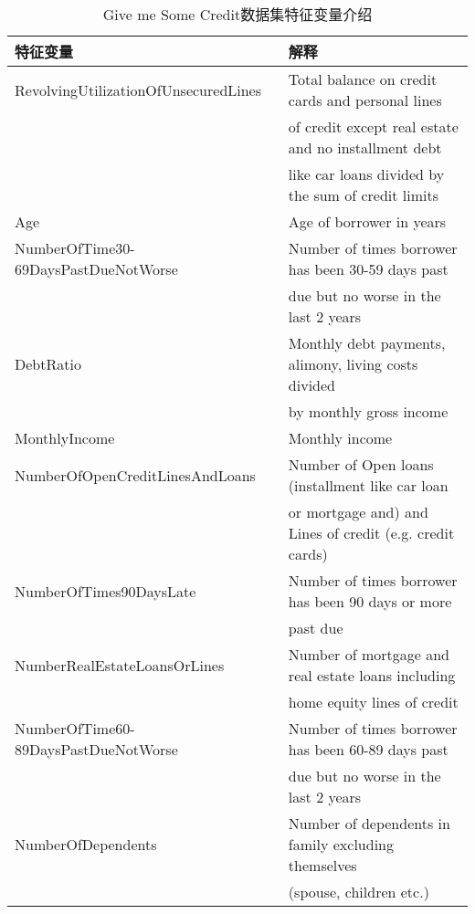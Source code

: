 \begin{table}[htbp]
	\centering
	\caption{\label{tab:kaggle}Give me Some Credit数据集特征变量介绍}
	\begin{tabular}{ll}
		\toprule
		   特征变量                              & 解释 \\
		\midrule
            RevolvingUtilizationOfUnsecuredLines & Total balance on credit cards and personal lines \\
		                                         & of credit except real estate and no installment debt\\
												 & like car loans divided by the sum of credit limits\\
	        Age                                  & Age of borrower in years\\
			NumberOfTime30-69DaysPastDueNotWorse & Number of times borrower has been 30-59 days past\\
			                                     &  due but no worse in the last 2 years\\
			DebtRatio                            & Monthly debt payments, alimony, living costs divided \\
			                                     & by monthly gross income\\
			MonthlyIncome                        & Monthly income \\
			NumberOfOpenCreditLinesAndLoans      & Number of Open loans (installment like car loan \\
			                                     &  or mortgage and) and Lines of credit (e.g. credit cards)\\
		    NumberOfTimes90DaysLate              & Number of times borrower has been 90 days or more \\
			                                     &  past due \\
			NumberRealEstateLoansOrLines         & Number of mortgage and real estate loans including \\
			                                     &  home equity lines of credit \\
			NumberOfTime60-89DaysPastDueNotWorse & Number of times borrower has been 60-89 days past \\
			                                     &  due but no worse in the last 2 years \\
			NumberOfDependents                   & Number of dependents in family excluding themselves \\
			                                     & (spouse, children etc.) \\
		\bottomrule
	\end{tabular}
\end{table}


